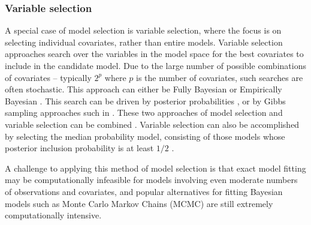 \subsubsection{Variable selection}

A special case of model selection is variable selection, where the focus is on
selecting individual covariates, rather than entire models. Variable selection
approaches search over the variables in the model space for the best covariates
to include in the candidate model. Due to the large number of possible
combinations of covariates -- typically $2^p$ where $p$ is the number of
covariates, such searches are often stochastic. This approach can either be
Fully Bayesian or Empirically Bayesian \citep{Cui2008}.  This search can be
driven by posterior probabilities  \citep{Casella2006}, or by Gibbs sampling
approaches such in \cite{George1993}. These two approaches of model selection and
variable selection can be combined  \citep{Geweke1996}. Variable selection can
also be accomplished by selecting the median probability model, consisting of
those models whose posterior inclusion probability is at least $1/2$
\citep{Barbieri2004}.

A challenge to applying this method of model selection is that exact model
fitting may be computationally infeasible for models involving even moderate
numbers of observations and covariates, and popular alternatives for fitting
Bayesian models such as Monte Carlo Markov Chains (MCMC) are still extremely computationally intensive.






